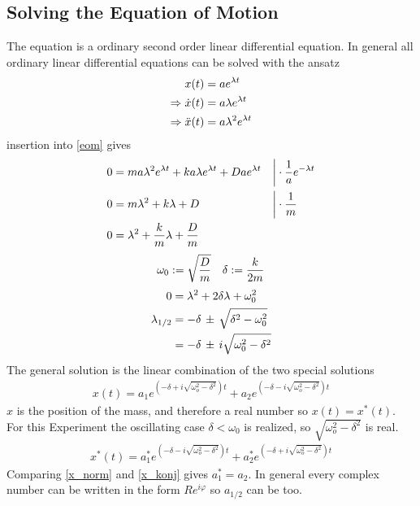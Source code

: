 \subsection{Solving the Equation of Motion}
The equation is a ordinary second order linear differential equation. In general all ordinary linear differential equations can be solved with the ansatz
\begin{align}
x(t) &= ae^{\lambda t} \notag\\
\Rightarrow \dot{x}(t) &= a \lambda e^{\lambda t} \notag\\
\Rightarrow \ddot{x}(t) &= a \lambda^2 e^{\lambda t} \notag
\end{align}
insertion into \eqref{eom} gives
\begin{align}
0 &= m a \lambda^2 e^{\lambda t} + k a \lambda e^{\lambda t} + D a e^{\lambda t} &\bigg\vert& \cdot \frac{1}{a} e^{- \lambda t} \notag\\
0 &= m \lambda^2 + k \lambda + D &\bigg\vert& \cdot \frac{1}{m} \notag\\
0 &= \lambda^2 + \frac{k}{m} \lambda + \frac{D}{m} && \notag
\end{align}
\begin{align}
\omega_0 := \sqrt{\frac{D}{m}} & & \delta := \frac{k}{2m} \notag
\end{align}
\begin{align}
0 &= \lambda^2 + 2\delta \lambda + \omega_0^2 \notag \\
\lambda_{1/2} &= - \delta\, \pm\, \sqrt{\delta^2-\omega_0^2} \notag \\
 &= - \delta\, \pm\, i\sqrt{\omega_0^2- \delta^2} \notag
\end{align}
The general solution is the linear combination of the two special solutions
\begin{align}
x(t) = a_1e^{\left(-\delta+i\sqrt{\omega_o^2-\delta^2} \right)t} + a_2e^{\left(-\delta-i\sqrt{\omega_o^2-\delta^2} \right)t}
\label{x_norm}
\end{align}
\(x\) is the position of the mass, and therefore a real number so \(x(t)=x^*(t)\). For this Experiment the oscillating case \(\delta < \omega_0\) is realized, so \(\sqrt{\omega_o^2-\delta^2}\) is real.
\begin{align}
x^*(t) = a_1^*e^{\left(-\delta-i\sqrt{\omega_o^2-\delta^2} \right)t} + a_2^*e^{\left(-\delta+i\sqrt{\omega_o^2-\delta^2} \right)t}
\label{x_konj}
\end{align}
Comparing \eqref{x_norm} and \eqref{x_konj} gives \(a_1^* = a_2\). In general every complex number can be written in the form \(Re^{i\varphi}\) so \(a_{1/2}\) can be too.
